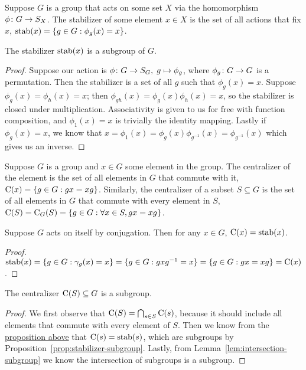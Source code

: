 \begin{definition}
    Suppose \(G\) is a group that acts on some set \(X\)
    via the homomorphism \(\phi\colon G\to S_X\).
    The stabilizer of some element \(x \in X\)
    is the set of all actions that fix \(x\),
    \(\operatorname{stab}(x) = \{g \in G : \phi_g(x) = x\}\).
\end{definition}
\begin{proposition}\label{prop:stabilizer-subgroup}
    The stabilizer \(\operatorname{stab}(x)\) is a subgroup of \(G\).
\end{proposition}
\begin{proof}
    Suppose our action is \(\phi\colon G\to S_G,\;g\mapsto\phi_g\),
    where \(\phi_g\colon G\to G\) is a permutation.
    Then the stabilizer is a set of all \(g\)
    such that \(\phi_g(x) = x\).
    Suppose \(\phi_g(x) = \phi_h(x) = x\);
    then \(\phi_{gh}(x) = \phi_g(x)\phi_h(x) = x\),
    so the stabilizer is closed under multiplication.
    Associativity is given to us for free with function composition,
    and \(\phi_1(x) = x\) is trivially the identity mapping.
    Lastly if \(\phi_g(x) = x\), we know that
    \(x = \phi_1(x) = \phi_g(x)\phi_{g^{-1}}(x) = \phi_{g^{-1}}(x)\)
    which gives us an inverse.
\end{proof}

\begin{definition}
    Suppose \(G\) is a group
    and \(x \in G\) some element in the group.
    The centralizer of the element
    is the set of all elements in \(G\) that commute with it,
    \(\operatorname{C}(x) = \{g \in G : gx = xg\}\).
    Similarly, the centralizer of a subset \(S \subseteq G\)
    is the set of all elements in \(G\)
    that commute with every element in \(S\),
    \(\operatorname{C}(S) = \operatorname{C}_G(S)
    = \{g \in G : \forall x \in S, gx = xg\}\).
\end{definition}
\begin{proposition}\label{prop:centralizer-stabilizer}
    Suppose \(G\) acts on itself by conjugation.
    Then for any \(x \in G\), \(\operatorname{C}(x) = \operatorname{stab}(x)\).
\end{proposition}
\begin{proof}
    \(\operatorname{stab}(x) = \{g \in G : \gamma_g(x) = x\}
    = \{g \in G : gxg^{-1} = x\} = \{g \in G : gx = xg\}
    = \operatorname{C}(x)\).
\end{proof}
\begin{corollary}\label{cor:centralizer-subgroup}
    The centralizer \(\operatorname{C}(S) \subseteq G\) is a subgroup.
\end{corollary}
\begin{proof}
    We first observe that
    \(\operatorname{C}(S) = \bigcap_{s \in S} \operatorname{C}(s)\),
    because it should include all elements
    that commute with every element of \(S\).
    Then we know from the
    \hyperref[prop:centralizer-stabilizer]{proposition above}
    that \(\operatorname{C}(s) = \operatorname{stab}(s)\),
    which are subgroups by Proposition~\ref{prop:stabilizer-subgroup}.
    Lastly, from Lemma~\ref{lem:intersection-subgroup} we know
    the intersection of subgroups is a subgroup.
\end{proof}

